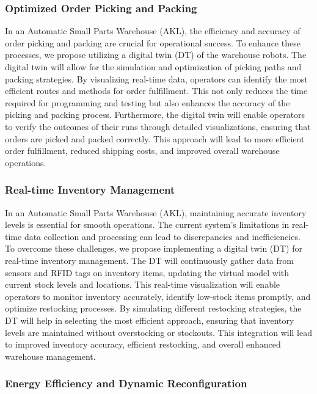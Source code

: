 \subsubsection{Optimized Order Picking and Packing}

In an Automatic Small Parts Warehouse (AKL), 
the efficiency and accuracy of order picking and packing are 
crucial for operational success. 
To enhance these processes, we propose utilizing a digital twin (DT) of the warehouse robots.
The digital twin will allow for the simulation and optimization 
of picking paths and packing strategies. 
By visualizing real-time data, operators can identify the most 
efficient routes and methods for order fulfillment. 
This not only reduces the time required for programming and 
testing but also enhances the accuracy of the picking and 
packing process.
Furthermore, the digital twin will enable operators to 
verify the outcomes of their runs through detailed 
visualizations, ensuring that orders are picked and packed 
correctly.
This approach will lead to more efficient order fulfillment, 
reduced shipping costs, and improved overall warehouse 
operations.
\subsubsection{Real-time Inventory Management}

In an Automatic Small Parts Warehouse (AKL), 
maintaining accurate inventory levels is essential for 
smooth operations. 
The current system's limitations in real-time data collection 
and processing can lead to discrepancies and inefficiencies. 
To overcome these challenges, we propose implementing a digital 
twin (DT) for real-time inventory management. 
The DT will continuously gather data from sensors and 
RFID tags on inventory items, 
updating the virtual model with current stock levels and 
locations. This real-time visualization will enable operators 
to monitor inventory accurately, 
identify low-stock items promptly, and optimize restocking 
processes. By simulating different restocking strategies, 
the DT will help in selecting the most efficient approach, 
ensuring that inventory levels are maintained without 
overstocking or stockouts. This integration will lead to 
improved inventory accuracy, efficient restocking, and overall 
enhanced warehouse management.

\subsubsection{Energy Efficiency and Dynamic Reconfiguration}

